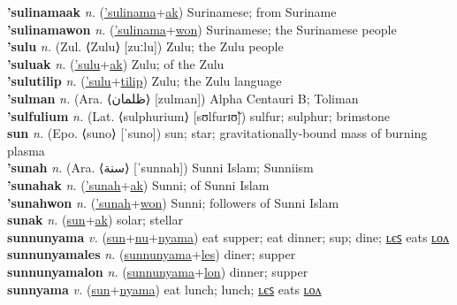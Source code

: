 \textbf{'sulinamaak} \textit{n.} (\hyperref['sulinama]{'sulinama}+\hyperref[ak]{ak})
Surinamese; from Suriname \label{'sulinamaak} \\
\textbf{'sulinamawon} \textit{n.} (\hyperref['sulinama]{'sulinama}+\hyperref[won]{won})
Surinamese; the Surinamese people \label{'sulinamawon} \\
\textbf{'sulu} \textit{n.} (Zul. ⟨Zulu⟩ [zuːlu])
Zulu; the Zulu people \label{'sulu} \\
\textbf{'suluak} \textit{n.} (\hyperref['sulu]{'sulu}+\hyperref[ak]{ak})
Zulu; of the Zulu \label{'suluak} \\
\textbf{'sulutilip} \textit{n.} (\hyperref['sulu]{'sulu}+\hyperref[tilip]{tilip})
Zulu; the Zulu language \label{'sulutilip} \\
\textbf{'sulman} \textit{n.} (Ara. ⟨ظلمان⟩ [zulman])
Alpha Centauri B; Toliman \label{'sulman} \\
\textbf{'sulfulium} \textit{n.} (Lat. ⟨sulphurium⟩ [sʊlfurɪʊ̃])
sulfur; sulphur; brimstone \label{'sulfulium} \\
\textbf{sun} \textit{n.} (Epo. ⟨suno⟩ [ˈsuno])
sun; star; gravitationally-bound mass of burning plasma \label{sun} \\
\textbf{'sunah} \textit{n.} (Ara. ⟨سنة⟩ [ˈsunnah])
Sunni Islam; Sunniism \label{'sunah} \\
\textbf{'sunahak} \textit{n.} (\hyperref['sunah]{'sunah}+\hyperref[ak]{ak})
Sunni; of Sunni Islam \label{'sunahak} \\
\textbf{'sunahwon} \textit{n.} (\hyperref['sunah]{'sunah}+\hyperref[won]{won})
Sunni; followers of Sunni Islam \label{'sunahwon} \\
\textbf{sunak} \textit{n.} (\hyperref[sun]{sun}+\hyperref[ak]{ak})
solar; stellar \label{sunak} \\
\textbf{sunnunyama} \textit{v.} (\hyperref[sun]{sun}+\hyperref[nu]{nu}+\hyperref[nyama]{nyama})
eat supper; eat dinner; sup; dine; \hyperref[sunnunyamales]{ʟєꜱ} eats \hyperref[sunnunyamalon]{ʟᴏᴧ} \label{sunnunyama} \\
\textbf{sunnunyamales} \textit{n.} (\hyperref[sunnunyama]{sunnunyama}+\hyperref[les]{les})
diner; supper \label{sunnunyamales} \\
\textbf{sunnunyamalon} \textit{n.} (\hyperref[sunnunyama]{sunnunyama}+\hyperref[lon]{lon})
dinner; supper \label{sunnunyamalon} \\
\textbf{sunnyama} \textit{v.} (\hyperref[sun]{sun}+\hyperref[nyama]{nyama})
eat lunch; lunch; \hyperref[sunnyamales]{ʟєꜱ} eats \hyperref[sunnyamalon]{ʟᴏᴧ} \label{sunnyama} \\
